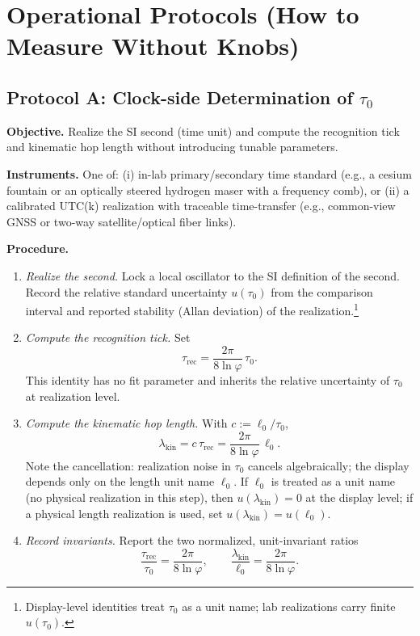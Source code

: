 \documentclass[11pt]{article}
\theoremstyle{plain}
\theoremstyle{definition}
\theoremstyle{remark}
\begin{document}
\section{Operational Protocols (How to Measure Without Knobs)}

\subsection*{Protocol A: Clock-side Determination of \(\tau_{0}\)}
\textbf{Objective.} Realize the SI second (time unit) and compute the recognition tick and kinematic hop length without introducing tunable parameters.

\textbf{Instruments.} One of:
(i) in-lab primary/secondary time standard (e.g., a cesium fountain or an optically steered hydrogen maser with a frequency comb), or
(ii) a calibrated UTC(k) realization with traceable time-transfer (e.g., common-view GNSS or two-way satellite/optical fiber links).

\textbf{Procedure.}
\begin{enumerate}
  \item \emph{Realize the second.} Lock a local oscillator to the SI definition of the second. Record the relative standard uncertainty \(u(\tau_{0})\) from the comparison interval and reported stability (Allan deviation) of the realization.\footnote{Display-level identities treat \(\tau_{0}\) as a unit name; lab realizations carry finite \(u(\tau_{0})\).}
  \item \emph{Compute the recognition tick.} Set
  \[
  \tau_{\mathrm{rec}}=\frac{2\pi}{8\ln\varphi}\,\tau_{0}.
  \]
  This identity has no fit parameter and inherits the relative uncertainty of \(\tau_{0}\) at realization level.
  \item \emph{Compute the kinematic hop length.} With \(c:=\ell_{0}/\tau_{0}\),
  \[
  \lambda_{\mathrm{kin}}=c\,\tau_{\mathrm{rec}}=\frac{2\pi}{8\ln\varphi}\,\ell_{0}.
  \]
  Note the cancellation: realization noise in \(\tau_{0}\) cancels algebraically; the display depends only on the length unit name \(\ell_{0}\). If \(\ell_{0}\) is treated as a unit name (no physical realization in this step), then \(u(\lambda_{\mathrm{kin}})=0\) at the display level; if a physical length realization is used, set \(u(\lambda_{\mathrm{kin}})=u(\ell_{0})\).
  \item \emph{Record invariants.} Report the two normalized, unit-invariant ratios
  \[
  \frac{\tau_{\mathrm{rec}}}{\tau_{0}}=\frac{2\pi}{8\ln\varphi},\qquad
  \frac{\lambda_{\mathrm{kin}}}{\ell_{0}}=\frac{2\pi}{8\ln\varphi}.
  \]
\end{enumerate}
\end{document}
